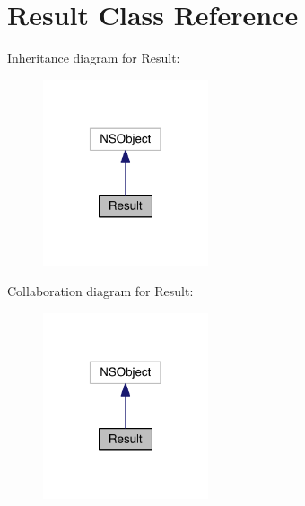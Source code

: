 \section{Result Class Reference}
\label{interface_result}


Inheritance diagram for Result\+:
\nopagebreak
\begin{figure}[H]
\begin{center}
\leavevmode
\includegraphics[width=138pt]{interface_result__inherit__graph}
\end{center}
\end{figure}


Collaboration diagram for Result\+:
\nopagebreak
\begin{figure}[H]
\begin{center}
\leavevmode
\includegraphics[width=138pt]{interface_result__coll__graph}
\end{center}
\end{figure}
